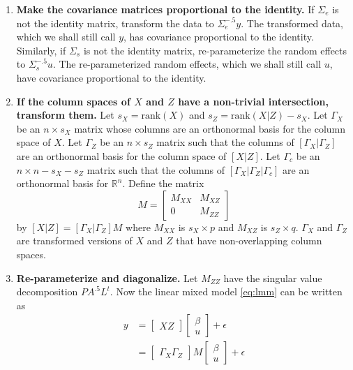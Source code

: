 \documentclass{report}
\begin{document}
\begin{enumerate}
  \item \textbf{Make the covariance matrices proportional to the identity.}  If $\Sigma_e$ is not the identity matrix,
    transform the data to $\Sigma_e^{-.5}y$.  The transformed data, which we shall still call $y$, has covariance
    proportional to the identity.  Similarly, if $\Sigma_s$ is not the identity matrix, re-parameterize the random
    effects to $\Sigma_s^{-.5}u$.  The re-parameterized random effects, which we shall still call $u$, have
    covariance proportional to the identity.
  \item \textbf{If the column spaces of $X$ and $Z$ have a non-trivial intersection, transform them.}
    Let $s_X=\text{rank}(X)$  and $s_Z=\text{rank}(X|Z) - s_X$.  Let $\Gamma_X$ be an $n \times s_X$ matrix whose
    columns are an orthonormal basis for the column space of $X$.  Let $\Gamma_Z$ be an $n \times s_Z$ matrix
    such that the columns of $\left[\Gamma_X | \Gamma_Z \right]$ are an orthonormal basis for the column space
    of $\left[X|Z\right]$.  Let $\Gamma_c$ be an $n \times n-s_X-s_Z$ matrix such that the columns of
    $\left[\Gamma_X | \Gamma_Z | \Gamma_c\right]$ are an orthonormal basis for $\mathbb{R}^n$.  Define the matrix
    \begin{equation*}
      M = \begin{bmatrix}
               M_{XX} & M_{XZ}\\
               0 & M_{ZZ}
             \end{bmatrix}
    \end{equation*}
    by $[X|Z] = [\Gamma_X|\Gamma_Z]M$ where $M_{XX}$ is $s_X \times p$ and $M_{XZ}$ is $s_Z \times q$.
    $\Gamma_X$ and $\Gamma_Z$ are transformed versions of $X$ and $Z$ that have non-overlapping
    column spaces.
  \item \textbf{Re-parameterize and diagonalize.}  Let $M_{ZZ}$ have the singular value decomposition
    $PA^{.5}L^t$.  Now the linear mixed model \eqref{eq:lmm} can be written as
    \begin{equation*}
      \begin{split}
        y &= \begin{bmatrix} X Z \end{bmatrix} \begin{bmatrix} \beta \\ u \end{bmatrix} + \epsilon\\
        &= \begin{bmatrix} \Gamma_X  \Gamma_Z \end{bmatrix} M \begin{bmatrix} \beta \\ u \end{bmatrix} + \epsilon\\

\end{split}
\end{equation*}
\end{enumerate}
\end{document}
